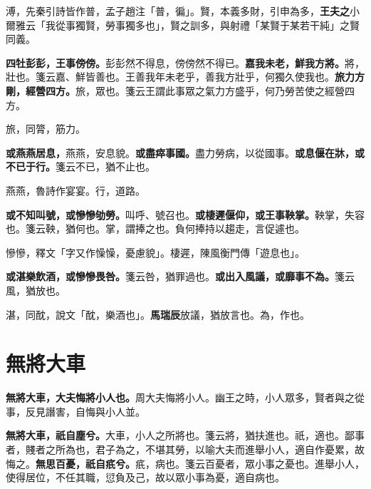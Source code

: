 \begin{quoting}溥，先秦引詩皆作普，孟子趙注「普，徧」。賢，本義多財，引申為多，\textbf{王夫之}小爾雅云「我從事獨賢，勞事獨多也」，賢之訓多，與射禮「某賢于某若干純」之賢同義。\end{quoting}

\textbf{四牡彭彭，王事傍傍。}{\footnotesize 彭彭然不得息，傍傍然不得已。}\textbf{嘉我未老，鮮我方將。}{\footnotesize 將，壯也。箋云嘉、鮮皆善也。王善我年未老乎，善我方壯乎，何獨久使我也。}\textbf{旅力方剛，經營四方。}{\footnotesize 旅，眾也。箋云王謂此事眾之氣力方盛乎，何乃勞苦使之經營四方。}

\begin{quoting}旅，同膂，筋力。\end{quoting}

\textbf{或燕燕居息，}{\footnotesize 燕燕，安息貌。}\textbf{或盡瘁事國。}{\footnotesize 盡力勞病，以從國事。}\textbf{或息偃在牀，或不已于行。}{\footnotesize 箋云不已，猶不止也。}

\begin{quoting}燕燕，魯詩作宴宴。行，道路。\end{quoting}

\textbf{或不知叫號，或慘慘劬勞。}{\footnotesize 叫呼、號召也。}\textbf{或棲遲偃仰，或王事鞅掌。}{\footnotesize 鞅掌，失容也。箋云鞅，猶何也。掌，謂捧之也。負何捧持以趨走，言促遽也。}

\begin{quoting}慘慘，釋文「字又作懆懆，憂慮貌」。棲遲，陳風衡門傳「遊息也」。\end{quoting}

\textbf{或湛樂飲酒，或慘慘畏咎。}{\footnotesize 箋云咎，猶罪過也。}\textbf{或出入風議，或靡事不為。}{\footnotesize 箋云風，猶放也。}

\begin{quoting}湛，同酖，說文「酖，樂酒也」。\textbf{馬瑞辰}放議，猶放言也。為，作也。\end{quoting}

\section{無將大車}


\textbf{無將大車，大夫悔將小人也。}{\footnotesize 周大夫悔將小人。幽王之時，小人眾多，賢者與之從事，反見譖害，自悔與小人並。}

\textbf{無將大車，祇自塵兮。}{\footnotesize 大車，小人之所將也。箋云將，猶扶進也。祇，適也。鄙事者，賤者之所為也，君子為之，不堪其勞，以喻大夫而進舉小人，適自作憂累，故悔之。}\textbf{無思百憂，祇自疧兮。}{\footnotesize 疧，病也。箋云百憂者，眾小事之憂也。進舉小人，使得居位，不任其職，愆負及己，故以眾小事為憂，適自病也。}

